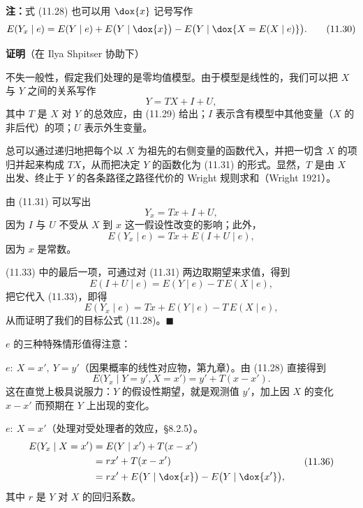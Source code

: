 \noindent\textbf{注：}式 \textup{(11.28)} 也可以用 $\dox{x}$ 记号写作
\begin{equation}
E(Y_x\mid e)=E(Y\mid e)+E\bigl(Y\mid\dox{x}\bigr)-E\bigl(Y\mid\dox{X=E(X\mid e)}\bigr). \tag{11.30}
\end{equation}

\noindent\textbf{证明}（在 Ilya Shpitser 协助下）

不失一般性，假定我们处理的是零均值模型。由于模型是线性的，我们可以把 $X$ 与 $Y$ 之间的关系写作
\begin{equation}
Y=TX+I+U, \tag{11.31}
\end{equation}
其中 $T$ 是 $X$ 对 $Y$ 的总效应，由 \textup{(11.29)} 给出；$I$ 表示含有模型中其他变量（$X$ 的非后代）的项；$U$ 表示外生变量。

总可以通过递归地把每个以 $X$ 为祖先的右侧变量的函数代入，并把一切含 $X$ 的项归并起来构成 $TX$，从而把决定 $Y$ 的函数化为 \textup{(11.31)} 的形式。显然，$T$ 是由 $X$ 出发、终止于 $Y$ 的各条路径之路径代价的 Wright 规则求和（Wright 1921）。

由 \textup{(11.31)} 可以写出
\begin{equation}
Y_x=Tx+I+U, \tag{11.32}
\end{equation}
因为 $I$ 与 $U$ 不受从 $X$ 到 $x$ 这一假设性改变的影响；此外，
\begin{equation}
E(Y_x\mid e)=Tx+E(I+U\mid e), \tag{11.33}
\end{equation}
因为 $x$ 是常数。

\textup{(11.33)} 中的最后一项，可通过对 \textup{(11.31)} 两边取期望来求值，得到
\begin{equation}
E(I+U\mid e)=E(Y\mid e)-T\,E(X\mid e), \tag{11.34}
\end{equation}
把它代入 \textup{(11.33)}，即得
\begin{equation}
E(Y_x\mid e)=Tx+E(Y\mid e)-T\,E(X\mid e), \tag{11.35}
\end{equation}
从而证明了我们的目标公式 \textup{(11.28)}。\hfill$\blacksquare$

$e$ 的三种特殊情形值得注意：

\begin{example}
$e:\ X=x',\ Y=y'$（因果概率的线性对应物，第九章）。由 \textup{(11.28)} 直接得到
\[
E\bigl(Y_x\mid Y=y',X=x'\bigr)=y'+T(x-x').
\]
这在直觉上极具说服力：$Y$ 的假设性期望，就是观测值 $y'$，加上因 $X$ 的变化 $x-x'$ 而预期在 $Y$ 上出现的变化。
\end{example}

\begin{example}
$e:\ X=x'$（处理对受处理者的效应，\S8.2.5）。
\begin{equation}
\begin{aligned}
E(Y_x\mid X=x')&=E(Y\mid x')+T(x-x')\\
&=rx'+T(x-x')\\
&=rx'+E\bigl(Y\mid\dox{x}\bigr)-E\bigl(Y\mid\dox{x'}\bigr),
\end{aligned} \tag{11.36}
\end{equation}
其中 $r$ 是 $Y$ 对 $X$ 的回归系数。
\end{example}


